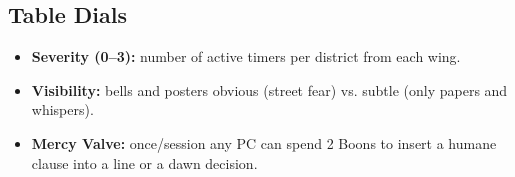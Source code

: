 \documentclass[11pt]{article}
\begin{document}
\subsection*{Table Dials}
\begin{itemize}
  \item \textbf{Severity (0--3):} number of active timers per district from each wing.
  \item \textbf{Visibility:} bells and posters obvious (street fear) vs. subtle (only papers and whispers).
  \item \textbf{Mercy Valve:} once/session any PC can spend 2 Boons to insert a humane clause into a line or a dawn decision.
\end{itemize}
\end{document}
